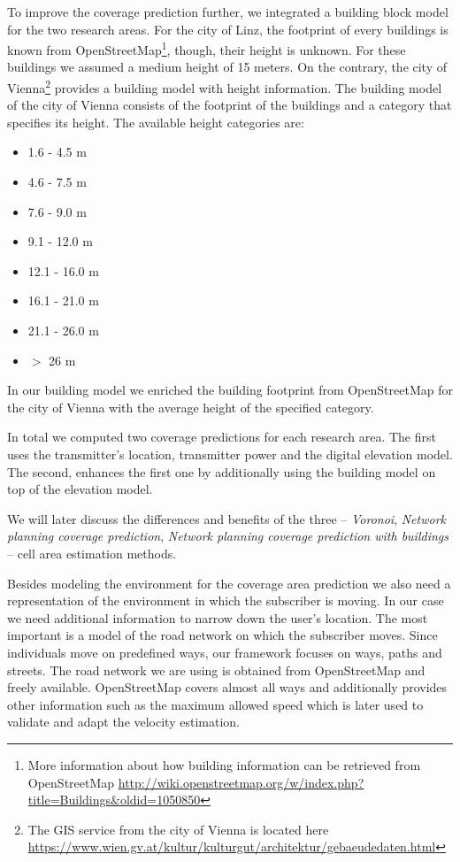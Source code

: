\documentclass[twocolumn]{bmcart}%
\begin{document}
To improve the coverage prediction further, we integrated a building block model for the two research areas. For the city of Linz, the footprint of every buildings is known from OpenStreetMap\footnote{More information about how building information can be retrieved from OpenStreetMap \url{http://wiki.openstreetmap.org/w/index.php?title=Buildings&oldid=1050850}}, though, their height is unknown. For these buildings we assumed a medium height of 15 meters. On the contrary, the city of Vienna\footnote{The GIS service from the city of Vienna is located here \url{https://www.wien.gv.at/kultur/kulturgut/architektur/gebaeudedaten.html}} provides a building model with height information. The building model of the city of Vienna consists of the footprint of the buildings and a category that specifies its height. The available height categories are: 
\begin{itemize}
	\item 1.6 - 4.5 m
	\item 4.6 - 7.5 m
	\item 7.6 - 9.0 m
	\item 9.1 - 12.0 m
	\item 12.1 - 16.0 m
	\item 16.1 - 21.0 m
	\item 21.1 - 26.0 m
	\item $>$ 26 m
\end{itemize}

In our building model we enriched the building footprint from OpenStreetMap for the city of Vienna with the average height of the specified category.

In total we computed two coverage predictions for each research area. The first uses the transmitter's location, transmitter power and the digital elevation model. The second, enhances the first one by additionally using the building model on top of the elevation model.

We will later discuss the differences and benefits of the three -- \emph{Voronoi}, \emph{Network planning coverage prediction}, \emph{Network planning coverage prediction with buildings} -- cell area estimation methods.\newline

Besides modeling the environment for the coverage area prediction we also need a representation of the environment in which the subscriber is moving. In our case we need additional information to narrow down the user's location. The most important is a model of the road network on which the subscriber moves. Since individuals move on predefined ways, our framework focuses on ways, paths and streets. The road network we are using is obtained from OpenStreetMap and freely available. OpenStreetMap covers almost all ways and additionally provides other information such as the maximum allowed speed which is later used to validate and adapt the velocity estimation.\newline
\end{document}
